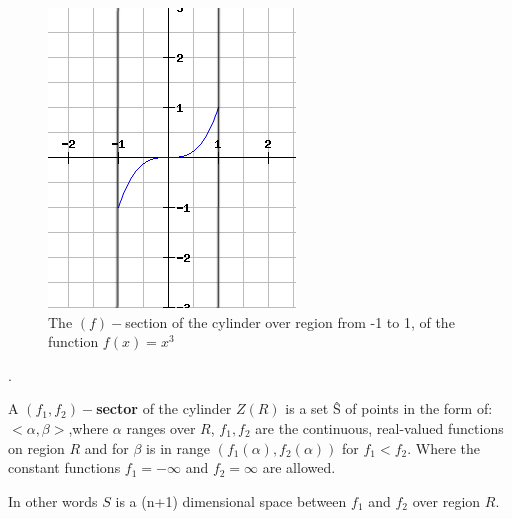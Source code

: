 \documentclass[
  digital, %
  twoside, %
  table,   %
  nolof,     %
  nolot,     %
]{fithesis3}
\begin{document}
\begin{figure}[H]
  \begin{center}
      \begin{minipage}{.4\textwidth}
          \includegraphics[width=\textwidth]{fithesis/images/section.png}
    \end{minipage}
  \end{center}
  \caption{The $(f)-$section of the cylinder over region from -1 to 1, of the function $f(x) = x^3$}
\end{figure}.

\begin{definition}
A \textbf{$(f_1, f_2)-$sector} of the cylinder $Z(R)$ is a set \^{S} of points in the form of: $<\alpha, \beta>$,where $\alpha$ ranges over $R$, $f_1, f_2$ are the continuous, real-valued functions on region $R$ and for $\beta$ is in range $(f_1(\alpha), f_2(\alpha))$ for $f_1 < f_2$. Where the constant functions $f_1 = -\infty$ and $f_2 = \infty$ are allowed.

In other words $S$ is a (n+1) dimensional space  between $f_1$ and $f_2$ over region $R$.
\end{definition}
\end{document}
